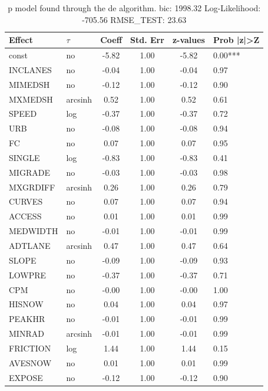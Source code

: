 \begin{table}
	\caption{p model found through the de algorithm. bic: 1998.32 Log-Likelihood: -705.56 RMSE_TEST: 23.63}
	\begin{center}
		\begin{tabular}{|l|l|c|c|c|l|}
			\hline
			Effect & $\tau$ & Coeff & Std. Err & z-values & Prob |z|>Z \\
			\hline
			const & no & -5.82 & 1.00 & -5.82 & 0.00*** \\
			\hline
			INCLANES & no & -0.04 & 1.00 & -0.04 & 0.97 \\
			\hline
			MIMEDSH & no & -0.12 & 1.00 & -0.12 & 0.90 \\
			\hline
			MXMEDSH & arcsinh & 0.52 & 1.00 & 0.52 & 0.61 \\
			\hline
			SPEED & log & -0.37 & 1.00 & -0.37 & 0.72 \\
			\hline
			URB & no & -0.08 & 1.00 & -0.08 & 0.94 \\
			\hline
			FC & no & 0.07 & 1.00 & 0.07 & 0.95 \\
			\hline
			SINGLE & log & -0.83 & 1.00 & -0.83 & 0.41 \\
			\hline
			MIGRADE & no & -0.03 & 1.00 & -0.03 & 0.98 \\
			\hline
			MXGRDIFF & arcsinh & 0.26 & 1.00 & 0.26 & 0.79 \\
			\hline
			CURVES & no & 0.07 & 1.00 & 0.07 & 0.94 \\
			\hline
			ACCESS & no & 0.01 & 1.00 & 0.01 & 0.99 \\
			\hline
			MEDWIDTH & no & -0.01 & 1.00 & -0.01 & 0.99 \\
			\hline
			ADTLANE & arcsinh & 0.47 & 1.00 & 0.47 & 0.64 \\
			\hline
			SLOPE & no & -0.09 & 1.00 & -0.09 & 0.93 \\
			\hline
			LOWPRE & no & -0.37 & 1.00 & -0.37 & 0.71 \\
			\hline
			CPM & no & -0.00 & 1.00 & -0.00 & 1.00 \\
			\hline
			HISNOW & no & 0.04 & 1.00 & 0.04 & 0.97 \\
			\hline
			PEAKHR & no & -0.01 & 1.00 & -0.01 & 0.99 \\
			\hline
			MINRAD & arcsinh & -0.01 & 1.00 & -0.01 & 0.99 \\
			\hline
			FRICTION & log & 1.44 & 1.00 & 1.44 & 0.15 \\
			\hline
			AVESNOW & no & 0.01 & 1.00 & 0.01 & 0.99 \\
			\hline
			EXPOSE & no & -0.12 & 1.00 & -0.12 & 0.90 \\

\end{tabular}
\end{center}
\end{table}
